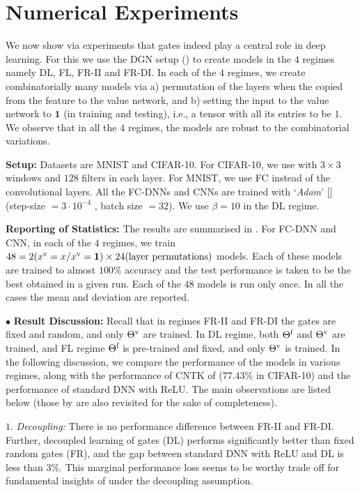 \section{Numerical Experiments}\label{sec:exp} 
We  now show via experiments that gates indeed play a central role in deep learning. For this we use the DGN setup () to create models in the $4$ regimes namely DL, FL, FR-II and FR-DI. In each of the $4$ regimes, we create  combinatorially many models via a) permutation of the layers when the copied from the feature to the value network, and b) setting the input to the value network to $\mathbf{1}$ (in training and testing), i.e., a tensor with all its entries to be $1$. We observe that in all the $4$ regimes, the models are robust to the combinatorial variations.

\textbf{Setup:} Datasets are MNIST and CIFAR-10. For CIFAR-10, we use  with $3\times 3$  windows and $128$ filters in each layer. For MNIST, we use FC instead of the convolutional layers.  All the FC-DNNs and CNNs are trained with `\emph{Adam}'  [] (step-size $=3\cdot 10^{-4}$ , batch size $=32$). We use $\beta=10$ in the DL regime.

\textbf{Reporting of Statistics:} The results are summarised in . For FC-DNN and CNN, in each of the $4$ regimes, we train $48= 2 (x^{\text{v}}=x / x^{\text{v}}=\mathbf{1}) \times 24(\text{layer permutations})$ models. Each of these models are trained to almost $100\%$ accuracy and the test performance is taken to be the best obtained in a given run. Each of the $48$ models is run only once. In all the cases the mean and deviation are reported.


$\bullet$ \textbf{Result Discussion:}  Recall that in regimes FR-II and FR-DI the gates are fixed and random, and only ${\Theta}^{\text{v}}$ are trained. In DL regime, both $\Theta^{\textrm{f}}$ and ${\Theta}^{\text{v}}$ are trained, and FL regime $\Theta^{\textrm{f}}$ is pre-trained and fixed, and only ${\Theta}^{\text{v}}$ is trained. In the following discussion, we compare the performance of the models in various regimes, along with the performance of CNTK of \cite{arora2019exact} ($77.43\%$ in CIFAR-10) and the performance of standard DNN with ReLU.  The main observations are listed below (those by \cite{ch2020neural} are also revisited for the sake of completeness). 

\indent\quad $1.$ \emph{Decoupling:} There is no performance difference between FR-II and FR-DI.%
Further, decoupled learning of gates (DL) performs significantly better than fixed random gates (FR), and the gap between standard DNN with ReLU and DL is less than $3\%$. This marginal performance loss seems to be worthy trade off for fundamental insights of  under the decoupling assumption.



